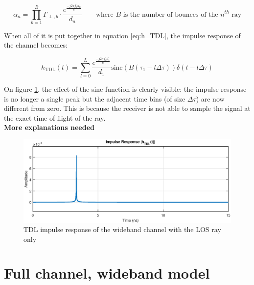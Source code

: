 \documentclass[10pt,a4paper]{ULBreport}
\begin{document}
\begin{equation*}
    \alpha_n = \prod_{b=1}^{B} \Gamma_{\perp, b} \cdot \frac{e^{\frac{-j2\pi f_c d_n}{c}}}{d_n} \qquad \text{where } B \text{ is the number of bounces of the } n^{th} \text{ ray}
\end{equation*}

When all of it is put together in equation \ref{eq:h_TDL}, the impulse response of the channel becomes:

\begin{equation*}
    h_{\text{TDL}}(t) = \sum_{l=0}^{L}\frac{e^{\frac{-j2\pi f_c d_1}{c}}}{d_1} \text{sinc}\left(B(\tau_1 - l\Delta\tau)\right) \delta(t - l\Delta\tau)
\end{equation*}

On figure \ref{fig:h_TDL_LOS}, the effect of the sinc function is clearly visible: the impulse response is no longer a single peak but the adjacent time bins (of size $\Delta\tau$) are now different from zero. This is because the receiver is not able to sample the signal at the exact time of flight of the ray. \\

\vspace{0.5cm}
\Large \textbf{More explanations needed}
\normalsize\\

\begin{figure}[H]
    \centering
    \includegraphics[width=1\textwidth]{4_2.eps}
    \caption{TDL impulse response of the wideband channel with the LOS ray only}
    \label{fig:h_TDL_LOS}
\end{figure}

\section{Full channel, wideband model}
\end{document}

